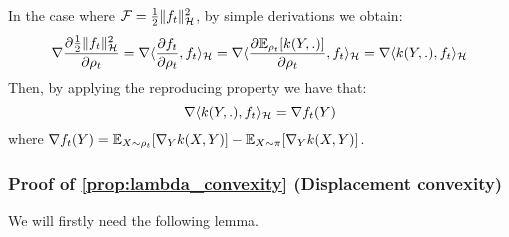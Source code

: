 In the case where ${{\mathcal F}}= \frac{1}{2} \|f_t\|^2_{{{\mathcal H}}}$, by simple derivations we obtain:
\begin{equation}
 \nabla \frac{\partial\frac{1}{2} \|f_t\|^2_{{{\mathcal H}}}}{\partial \rho_t}= \nabla \langle \frac{\partial f_t}{\partial \rho_t}, f_t \rangle_{{{\mathcal H}}}= \nabla \langle \frac{\partial {{\mathbb E}}_{\rho_t}[k(Y,.)]}{\partial \rho_t}, f_t \rangle_{{{\mathcal H}}}= \nabla \langle k(Y,.), f_t \rangle_{{{\mathcal H}}}
\end{equation}
Then, by applying the reproducing property we have that:
\begin{equation}
\nabla \langle k(Y,.), f_t \rangle_{{{\mathcal H}}}
= \nabla f_t(Y)
\end{equation}
where $\nabla f_t(Y)= {{\mathbb E}}_{X \sim \rho_t}[\nabla_{Y}k(X,Y)] -  {{\mathbb E}}_{X \sim \pi}[\nabla_{Y}k(X,Y)]$.

\subsubsection{Proof of \cref{prop:lambda_convexity} (Displacement convexity)}

We will firstly need the following lemma.

